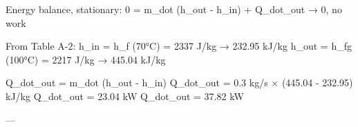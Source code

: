 Energy balance, stationary:  
0 = m_dot (h_out - h_in) + Q_dot_out → 0, no work  

From Table A-2:  
h_in = h_f (70°C) = 2337 J/kg → 232.95 kJ/kg  
h_out = h_fg (100°C) = 2217 J/kg → 445.04 kJ/kg  

Q_dot_out = m_dot (h_out - h_in)  
Q_dot_out = 0.3 kg/s × (445.04 - 232.95) kJ/kg  
Q_dot_out = 23.04 kW  
Q_dot_out = 37.82 kW  

---